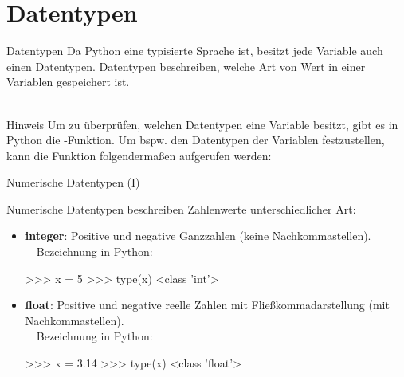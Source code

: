     \section{Datentypen}
    
        \begin{frame}{Datentypen}
            Da Python eine typisierte Sprache ist, besitzt jede Variable auch einen Datentypen. Datentypen beschreiben, welche Art von Wert in einer Variablen gespeichert ist. \\~\
            
            \begin{block}{Hinweis}
                Um zu überprüfen, welchen Datentypen eine Variable besitzt, gibt es in Python die -Funktion. Um bspw. den Datentypen der Variablen  festzustellen, kann die Funktion folgendermaßen aufgerufen werden: 
            \end{block}
        \end{frame}
        
        \begin{frame}[fragile]{Numerische Datentypen (I)}
            
            Numerische Datentypen beschreiben Zahlenwerte unterschiedlicher Art:
            
            \begin{itemize}
                \item \textbf{integer}: Positive und negative Ganzzahlen (keine Nachkommastellen). \\~\
                Bezeichnung in Python: \textbf{}
\begin{pyconcode}
>>> x = 5
>>> type(x)
<class 'int'>
\end{pyconcode}
            
                \item \textbf{float}: Positive und negative reelle Zahlen mit Fließkommadarstellung (mit Nachkommastellen). \\~\
                Bezeichnung in Python: \textbf{}
\begin{pyconcode}
>>> x = 3.14
>>> type(x)
<class 'float'>
\end{pyconcode}

            \end{itemize}
        \end{frame}
        
